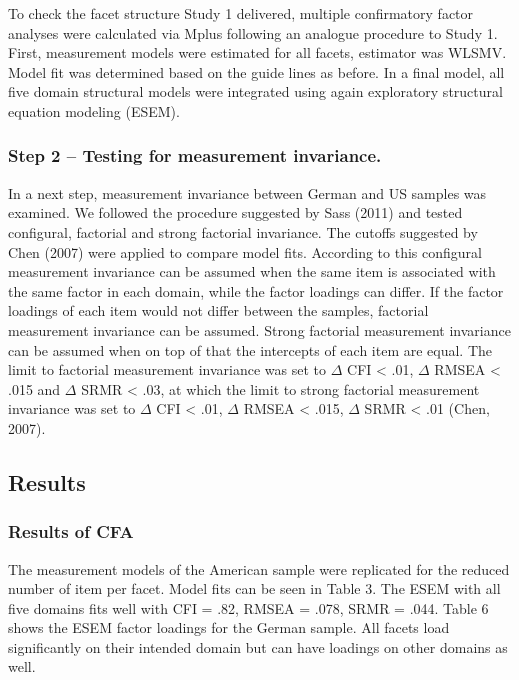 \documentclass[man]{apa6}
\theoremstyle{definition}
\theoremstyle{definition}
\theoremstyle{definition}
\theoremstyle{remark}
\begin{document}
To check the facet structure Study 1 delivered, multiple confirmatory
factor analyses were calculated via Mplus following an analogue
procedure to Study 1. First, measurement models were estimated for all
facets, estimator was WLSMV. Model fit was determined based on the guide
lines as before. In a final model, all five domain structural models
were integrated using again exploratory structural equation modeling
(ESEM).

\hypertarget{step-2-testing-for-measurement-invariance.}{%
\subsubsection{Step 2 -- Testing for measurement
invariance.}\label{step-2-testing-for-measurement-invariance.}}

In a next step, measurement invariance between German and US samples was
examined. We followed the procedure suggested by Sass (2011) and tested
configural, factorial and strong factorial invariance. The cutoffs
suggested by Chen (2007) were applied to compare model fits. According
to this configural measurement invariance can be assumed when the same
item is associated with the same factor in each domain, while the factor
loadings can differ. If the factor loadings of each item would not
differ between the samples, factorial measurement invariance can be
assumed. Strong factorial measurement invariance can be assumed when on
top of that the intercepts of each item are equal. The limit to
factorial measurement invariance was set to \(\Delta\) CFI \textless{}
.01, \(\Delta\) RMSEA \textless{} .015 and \(\Delta\) SRMR \textless{}
.03, at which the limit to strong factorial measurement invariance was
set to \(\Delta\) CFI \textless{} .01, \(\Delta\) RMSEA \textless{}
.015, \(\Delta\) SRMR \textless{} .01 (Chen, 2007).

\hypertarget{results-1}{%
\subsection{Results}\label{results-1}}

\hypertarget{results-of-cfa}{%
\subsubsection{Results of CFA}\label{results-of-cfa}}

The measurement models of the American sample were replicated for the
reduced number of item per facet. Model fits can be seen in Table 3. The
ESEM with all five domains fits well with CFI = .82, RMSEA = .078, SRMR
= .044. Table 6 shows the ESEM factor loadings for the German sample.
All facets load significantly on their intended domain but can have
loadings on other domains as well.
\end{document}
